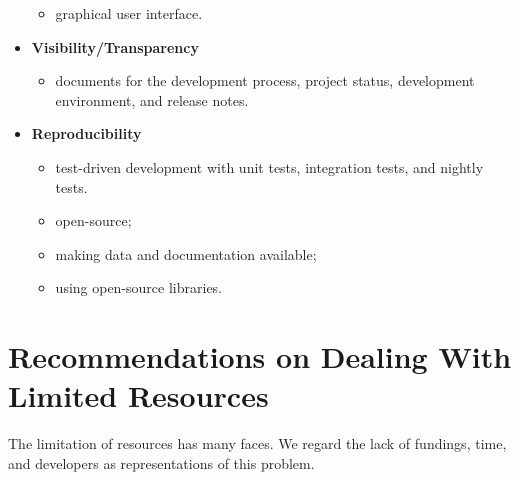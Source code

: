 \begin{itemize}
\begin{itemize}
    \item graphical user interface.
\end{itemize}
\item \textbf{Visibility/Transparency}
\begin{itemize}
    \item documents for the development process, project status, development environment, and release notes.
\end{itemize}
\item \textbf{Reproducibility}
\begin{itemize}
    \item test-driven development with unit tests, integration tests, and nightly tests.
    \item open-source;
    \item making data and documentation available;
    \item using open-source libraries.
\end{itemize}
\end{itemize}

\section{Recommendations on Dealing With Limited Resources}
\label{sec_recommendations_limited_resources}

The limitation of resources has many faces. We regard the lack of fundings, time, and developers as representations of this problem.

